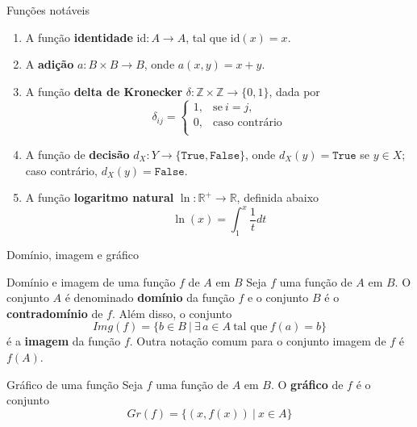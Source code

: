 \begin{frame}[fragile]{Funções notáveis}

    \begin{enumerate}
        \item A função \textbf{identidade} $\mathrm{id}: A\to A$, tal que $\mathrm{id}(x) = x$.

        \item A \textbf{adição} $a: B\times B \to B$, onde $a(x, y) = x + y$.
 
        \item A função \textbf{delta de Kronecker} $\delta: \mathbb{Z}\times \mathbb{Z}\to 
            \lbrace 0, 1\rbrace$, dada por
            \[
                \delta_{ij} = \left\lbrace \begin{array}{ll} 1, & \mbox{se}\ i = j, \\
                                                             0, & \mbox{caso contrário}\\
                                           \end{array} \right.
            \]

        \item A função de \textbf{decisão} $d_X: Y\to \lbrace \mathtt{True, False}\rbrace$, onde
            $d_X(y) = \mathtt{True}$ se $y\in X$; caso contrário, $d_X(y) = \mathtt{False}$.

        \item A função \textbf{logaritmo natural} $\ln: \mathbb{R^+}\to \mathbb{R}$, definida 
        abaixo
        \[
            \ln(x) = \int_1^x \frac{1}{t} dt
        \]

    \end{enumerate}

\end{frame}

\begin{frame}[fragile]{Domínio, imagem e gráfico}

    \begin{block}{Domínio e imagem de uma função $f$ de $A$ em $B$}
        Seja $f$ uma função de $A$ em $B$. O conjunto $A$ é denominado \textbf{domínio} da
            função $f$ e o conjunto $B$ é o \textbf{contradomínio} de $f$. Além disso, o conjunto
        \[
            Img(f) = \lbrace b \in B\ |\ \exists\, a\in A\ \mbox{tal que}\ f(a) = b \rbrace
        \]
        é a \textbf{imagem} da função $f$. Outra notação comum para o conjunto imagem de $f$ é 
        $f(A)$.
    \end{block}

    \vspace{0.05in}

    \begin{block}{Gráfico de uma função}
        Seja $f$ uma função de $A$ em $B$. O \textbf{gráfico} de $f$ é o conjunto
        \[
            Gr(f) = \lbrace (x, f(x))\ |\ x\in A\rbrace
        \]
    \end{block}

\end{frame}

